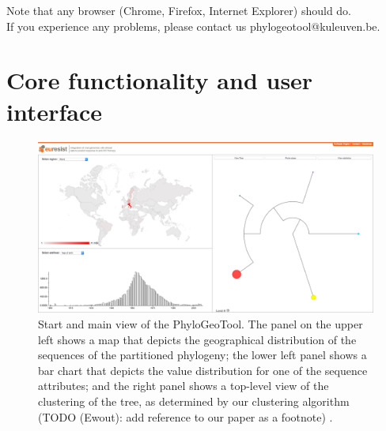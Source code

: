 \documentclass[a4paper, 11pt]{article} %
\begin{document}
Note that any browser (Chrome, Firefox, Internet Explorer) should do.\\

\noindent If you experience any problems, please contact us phylogeotool@kuleuven.be.


\section{Core functionality and user interface}
\label{sec:core_func_user_interface}
\begin{figure}[H]
\centering
\includegraphics[scale=0.1875]{images/defaultScreenshot.png}
\vspace{-0.75cm}
\caption{Start and main view of the PhyloGeoTool. 
  The panel on the upper left shows a map that depicts the geographical distribution of the sequences of the partitioned phylogeny; the lower left panel shows a bar chart that depicts the value distribution for one of the sequence attributes; and the right panel shows a top-level view of the clustering of the tree, as determined by our clustering algorithm (TODO (Ewout): add reference to our paper as a footnote) .}
\label{fig:initialview}
\end{figure}
\end{document}
